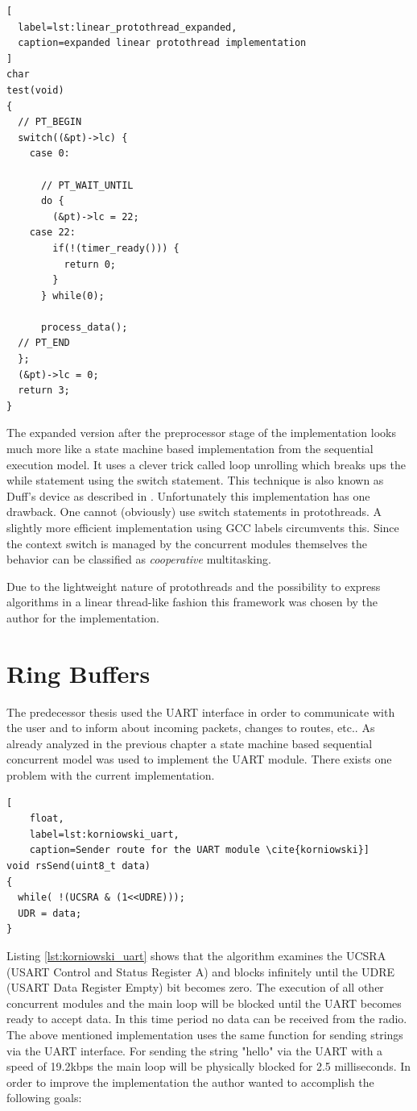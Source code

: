 \begin{lstlisting}[
  label=lst:linear_protothread_expanded,
  caption=expanded linear protothread implementation
]
char
test(void)
{
  // PT_BEGIN
  switch((&pt)->lc) {
    case 0:

      // PT_WAIT_UNTIL
      do {
        (&pt)->lc = 22;
    case 22:
        if(!(timer_ready())) {
          return 0;
        }
      } while(0);

      process_data();
  // PT_END
  };
  (&pt)->lc = 0;
  return 3;
}
\end{lstlisting}

The expanded version after the preprocessor stage of the implementation looks much more like a state machine based implementation from the sequential execution model. It uses a clever trick called loop unrolling \cite{abrash} which breaks ups the while statement using the switch statement. This technique is also known as Duff's device as described in \cite{duff}. Unfortunately this implementation has one drawback. One cannot (obviously) use switch statements in protothreads. A slightly more efficient implementation using GCC labels circumvents this. Since the context switch is managed by the concurrent modules themselves the behavior can be classified as \emph{cooperative} multitasking.

Due to the lightweight nature of protothreads and the possibility to express algorithms in a linear thread-like fashion this framework was chosen by the author for the implementation.

\section{Ring Buffers}%
The predecessor thesis \cite{korniowski} used the UART interface in order to communicate with the user and to inform about incoming packets, changes to routes, etc.. As already analyzed in the previous chapter a state machine based sequential concurrent model was used to implement the UART module. There exists one problem with the current implementation.

\begin{lstlisting}[
	float,
	label=lst:korniowski_uart,
	caption=Sender route for the UART module \cite{korniowski}]
void rsSend(uint8_t data)
{
  while( !(UCSRA & (1<<UDRE)));
  UDR = data;
}
\end{lstlisting}

Listing \ref{lst:korniowski_uart} shows that the algorithm examines the UCSRA (USART Control and Status Register A) and blocks infinitely until the UDRE (USART Data Register Empty) bit becomes zero. The execution of all other concurrent modules and the main loop will be blocked until the UART becomes ready to accept data. In this time period no data can be received from the radio. The above mentioned implementation uses the same function for sending strings via the UART interface. For sending the string "hello" via the UART with a speed of 19.2kbps the main loop will be physically blocked for 2.5 milliseconds. In order to improve the implementation the author wanted to accomplish the following goals:

